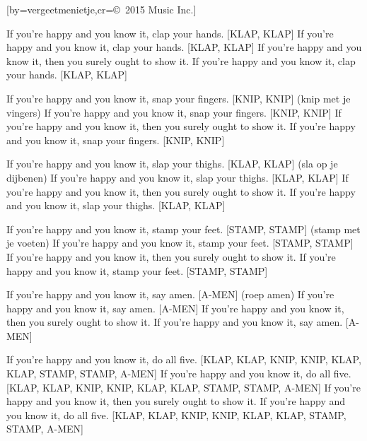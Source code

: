  

[by=vergeetmenietje,cr={\copyright~2015 Music Inc.}]




\beginverse
If you're happy and you know it, clap your hands. [KLAP, KLAP] 
If you're happy and you know it, clap your hands. [KLAP, KLAP]
If you're happy and you know it, then you surely ought to show it.
If you're happy and you know it, clap your hands. [KLAP, KLAP]
\endverse

\beginverse
If you're happy and you know it, snap your fingers. [KNIP, KNIP] (knip met je vingers)
If you're happy and you know it, snap your fingers. [KNIP, KNIP]
If you're happy and you know it, then you surely ought to show it.
If you're happy and you know it, snap your fingers. [KNIP, KNIP]
\endverse

\beginverse

If you're happy and you know it, slap your thighs. [KLAP, KLAP] (sla op je dijbenen)
If you're happy and you know it, slap your thighs. [KLAP, KLAP]
If you're happy and you know it, then you surely ought to show it.
If you're happy and you know it, slap your thighs. [KLAP, KLAP]

\endverse

\beginverse
If you're happy and you know it, stamp your feet. [STAMP, STAMP] (stamp met je voeten)
If you're happy and you know it, stamp your feet. [STAMP, STAMP]
If you're happy and you know it, then you surely ought to show it.
If you're happy and you know it, stamp your feet. [STAMP, STAMP]
\endverse

\beginverse

If you're happy and you know it, say amen. [A-MEN] (roep amen)
If you're happy and you know it, say amen. [A-MEN]
If you're happy and you know it, then you surely ought to show it.
If you're happy and you know it, say amen. [A-MEN]
\endverse

\beginverse

If you're happy and you know it, do all five. [KLAP, KLAP, KNIP, KNIP, KLAP, KLAP, STAMP, STAMP, A-MEN]
If you're happy and you know it, do all five. [KLAP, KLAP, KNIP, KNIP, KLAP, KLAP, STAMP, STAMP, A-MEN]
If you're happy and you know it, then you surely ought to show it.
If you're happy and you know it, do all five. [KLAP, KLAP, KNIP, KNIP, KLAP, KLAP, STAMP, STAMP, A-MEN]
\endverse





\endsong

